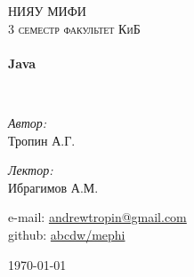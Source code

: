 \begin{titlepage}
  \begin{center}


    \textsc{\LARGE НИЯУ МИФИ}\\[1.5cm]

    \textsc{\Large 3 семестр факультет КиБ}\\[0.5cm]

    \HRule \\[0.4cm]
    {\huge \bfseries Java\\[0.4cm]}

    \HRule \\[1.5cm]

    \begin{minipage}{0.4\textwidth}
      \begin{flushleft} \large
        \emph{Автор:}\\
        Тропин \textsc{А.Г.}
      \end{flushleft}
    \end{minipage}
    \begin{minipage}{0.4\textwidth}
      \begin{flushright} \large
        \emph{Лектор:} \\
        Ибрагимов \textsc{А.М.}
      \end{flushright}
    \end{minipage}

    \vfill
    \begin{flushleft}
      e-mail: \href{mailto:andrewtropin@gmail.com}{andrewtropin@gmail.com} \\
      github: \href{http://github.com/abcdw/mephi}{abcdw/mephi}
    \end{flushleft}
    {\large \today}
  \end{center}
\end{titlepage}
